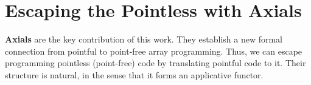 \needspace{25em}
\section{Escaping the Pointless with Axials}
\label{escaping-the-pointless}

\textbf{Axials} are the key contribution of this work. They establish a new formal connection from pointful to point-free array programming. Thus, we can escape programming pointless (point-free) code by translating pointful code to it. Their structure is natural, in the sense that it forms an applicative functor.


\newcommand{\sizeat}[1]{s_{#1}}
\newcommand{\altsizeat}[1]{S_{#1}}
\newcommand{\denotindex}{\mathrm{Index}}
\newcommand{\denotvalue}{\mathrm{Value}}
\newcommand{\denotvar}{\mathrm{Var}}
\newcommand{\denotenv}{\mathrm{Env}}
\newcommand{\denotenvindex}{\mathrm{IndexEnv}}
\newcommand{\denotenvvar}{\mathrm{VarEnv}}


